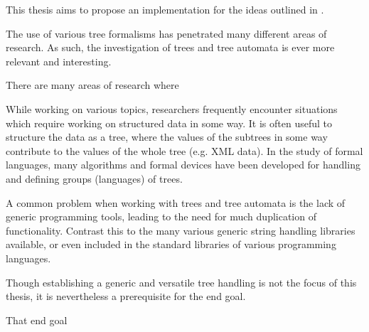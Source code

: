 This thesis aims to propose an implementation for the ideas outlined in
\cite{drewes_marbles}.  




The use of various tree formalisms has penetrated many different areas of
research. As such, the investigation of trees and tree automata is ever
more relevant and interesting. 




There are many areas of research where 

While working on various topics, researchers frequently encounter
situations which require working on structured data in some way. It is
often useful to structure the data as a tree, where the values of the
subtrees in some way contribute to the values of the whole tree (e.g. XML
data). In the study of formal languages, many algorithms and formal devices
have been developed for handling and defining groups (languages) of trees.



A common problem when working with trees and tree automata is the lack of
generic programming tools, leading to the need for much duplication of
functionality. Contrast this to the many various generic string handling
libraries available, or even included in the standard libraries of various
programming languages.

Though establishing a generic and versatile tree handling is not the focus
of this thesis, it is nevertheless a prerequisite for the end goal. 

That end goal

